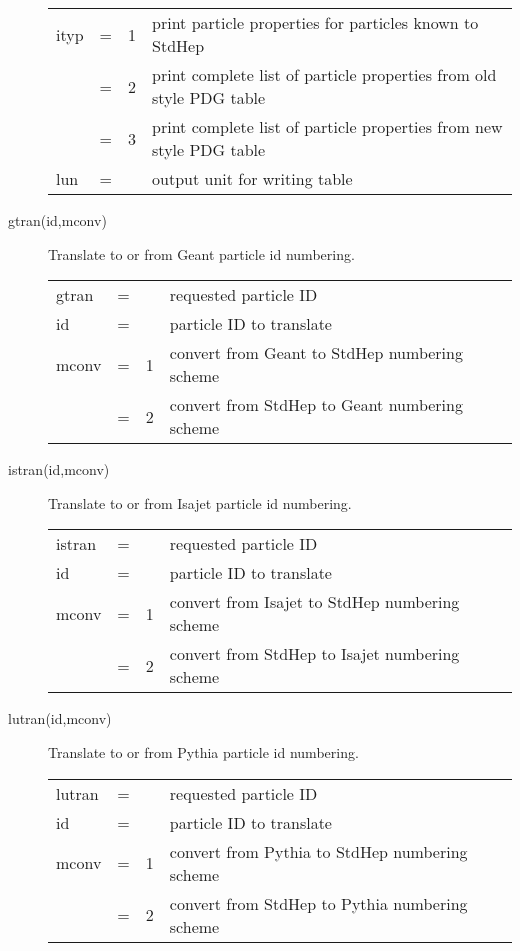 \begin{description}
\begin{tabular}{lcll}
ityp & = & 1 & print particle properties for particles known to StdHep \\
     & = & 2 & print complete list of particle properties from old style PDG table \\
     & = & 3 & print complete list of particle properties from new style PDG table \\
lun  & = &   & output unit for writing table \\
\end{tabular}

\item[gtran(id,mconv)] Translate to or from Geant particle id numbering. 

\begin{tabular}{lcll}
gtran & = &   & requested particle ID \\
id    & = &   & particle ID to translate \\
mconv & = & 1 & convert from Geant to StdHep numbering scheme \\
      & = & 2 & convert from StdHep to Geant numbering scheme \\
\end{tabular}

\item[istran(id,mconv)] Translate to or from Isajet particle id numbering. 

\begin{tabular}{lcll}
istran & = &   & requested particle ID \\
id     & = &   & particle ID to translate \\
mconv  & = & 1 & convert from Isajet to StdHep numbering scheme \\
       & = & 2 & convert from StdHep to Isajet numbering scheme \\
\end{tabular}

\item[lutran(id,mconv)] Translate to or from Pythia particle id numbering. 

\begin{tabular}{lcll}
lutran & = &   & requested particle ID \\
id     & = &   & particle ID to translate \\
mconv  & = & 1 & convert from Pythia to StdHep numbering scheme \\
       & = & 2 & convert from StdHep to Pythia numbering scheme \\
\end{tabular}


\end{description}
